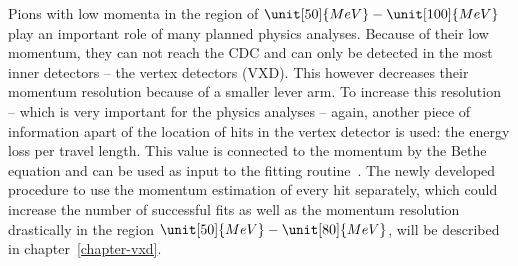 Pions with low momenta in the region of $\unit[50]{MeV} - \unit[100]{MeV}$ play an important role of many planned physics analyses. Because of their low momentum, they can not reach the CDC and can only be detected in the most inner detectors -- the vertex detectors (VXD). This however decreases their momentum resolution because of a smaller lever arm. To increase this resolution -- which is very important for the physics analyses -- again, another piece of information apart of the location of hits in the vertex detector is used: the energy loss per travel length. This value is connected to the momentum by the Bethe equation and can be used as input to the fitting routine~\cite{robert}. The newly developed procedure to use the momentum estimation of every hit separately, which could increase the number of successful fits as well as the momentum resolution drastically in the region $\unit[50]{MeV} - \unit[80]{MeV}$, will be described in chapter~\ref{chapter-vxd}.

